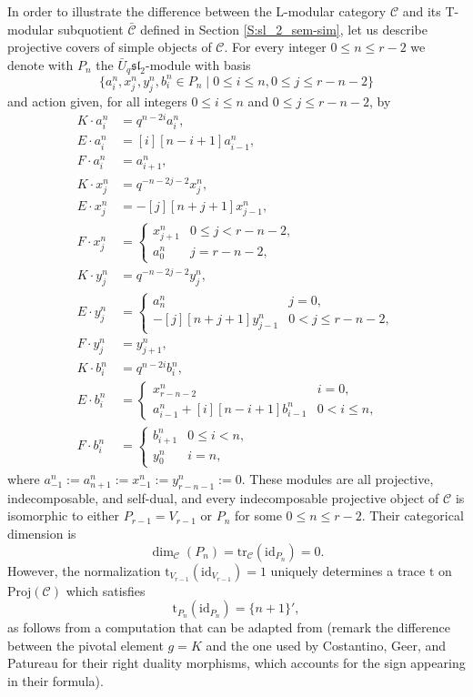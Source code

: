 \documentclass[a4paper,reqno]{amsart}
\theoremstyle{definition}
\theoremstyle{remark}
\newcommand{\rmt}{\mathrm{t}}
\newcommand{\calC}{\mathcal{C}}
\newcommand{\id}{\mathrm{id}}
\newcommand{\tr}{\mathrm{tr}}
\newcommand{\leqs}{\leqslant}
\newcommand{\fsl}{\mathfrak{sl}}
\newcommand{\Proj}{\mathrm{Proj}}
\begin{document}
In order to illustrate the difference between the L-modular category $\calC$ and its T-modular subquotient $\bar{\calC}$ defined in Section \ref{S:sl_2_sem-sim}, let us describe projective covers of simple objects of $\calC$. For every integer $0 \leqs n \leqs r-2$ we denote with $P_n$ the $\bar{U}_q \fsl_2$-module with basis 
\[
 \{ a_i^n, x_j^n, y_j^n, b_i^n \in P_n \mid 0 \leqs i \leqs n, 0 \leqs j \leqs r-n-2 \}
\] 
and action given, for all integers $0 \leqs i \leqs n$ and $0 \leqs j \leqs r-n-2$, by
\begin{equation*}
 \begin{split}
  K \cdot a_i^n &= q^{n-2i} a_i^n, \\
  E \cdot a_i^n &= [i][n-i+1] a_{i-1}^n, \\
  F \cdot a_i^n &= a_{i+1}^n, \\
  K \cdot x_j^n &= q^{-n-2j-2} x_j^n, \\
  E \cdot x_j^n &= -[j][n+j+1] x_{j-1}^n, \\ 
  F \cdot x_j^n &= 
  \begin{cases}
   x_{j+1}^n & 0 \leqs j < r-n-2, \\
   a_0^n & j = r-n-2,
  \end{cases} \\
  K \cdot y_j^n &= q^{-n-2j-2} y_j^n, \\
  E \cdot y_j^n &= 
  \begin{cases}
   a_n^n & j = 0, \\
   -[j][n+j+1] y_{j-1}^n & 0 < j \leqs r-n-2,
  \end{cases} \\
  F \cdot y_j^n &= y_{j+1}^n, \\
  K \cdot b_i^n &= q^{n-2i} b_i^n, \\
  E \cdot b_i^n &= 
  \begin{cases}
   x_{r-n-2}^n & i = 0, \\
   a_{i-1}^n + [i][n-i+1] b_{i-1}^n & 0 < i \leqs n, 
  \end{cases} \\
  F \cdot b_i^n &= 
  \begin{cases}
   b_{i+1}^n & 0 \leqs i < n, \\
   y_0^n & i = n,
  \end{cases}
 \end{split}
\end{equation*}
where $a_{-1}^n := a_{n+1}^n := x_{-1}^n := y_{r-n-1}^n := 0$. These modules are all projective, indecomposable, and self-dual, and every indecomposable projective object of $\calC$ is isomorphic to either $P_{r-1} = V_{r-1}$ or $P_n$ for some $0 \leqs n \leqs r-2$. Their categorical dimension is
\[
 \dim_\calC(P_n) = \tr_\calC(\id_{P_n}) = 0.
\]
However, the normalization $\rmt_{V_{r-1}}(\id_{V_{r-1}}) = 1$ uniquely determines a trace $\rmt$ on $\Proj(\calC)$ which satisfies
\[
 \rmt_{P_n}(\id_{P_n}) = \{ n+1 \}',
\]
as follows from a computation that can be adapted from \cite[Lem.~6.9]{CGP14} (remark the difference between the pivotal element $g = K$ and the one used by Costantino, Geer, and Patureau for their right duality morphisms, which accounts for the sign appearing in their formula).
\end{document}
